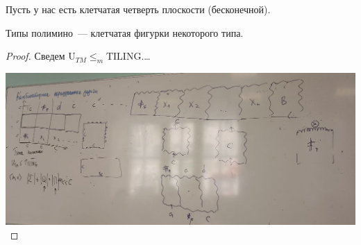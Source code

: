 \begin{problem}

    Пусть у нас есть клетчатая четверть плоскости (бесконечной).

    Типы полимино~--- клетчатая фигурки некоторого типа.


\end{problem}
\begin{proof}
    Сведем $\mathrm{U}_{TM} \leqslant_m \mathrm{TILING}$.\ldots

    \includegraphics[scale=0.35]{img/polymyno_MT.jpg}
\end{proof}
